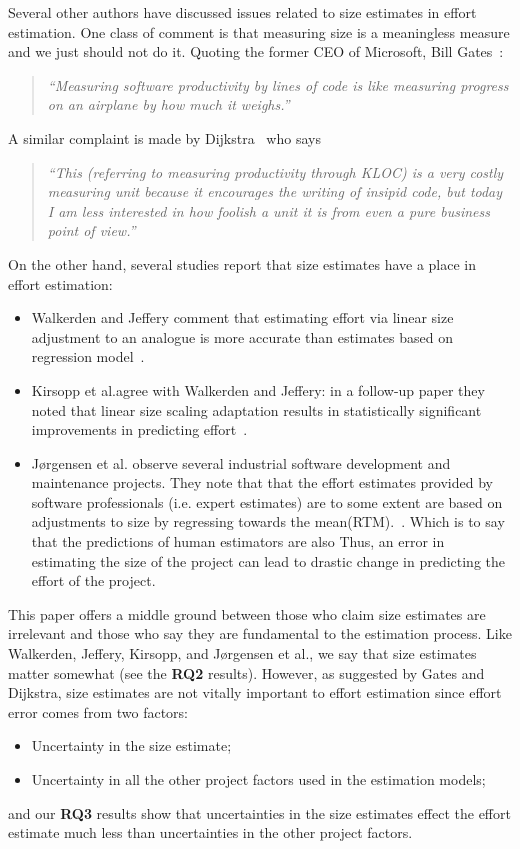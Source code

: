 \documentclass[final,twocolumn]{elsarticle}
\newcommand{\etal}{et al.}
\newcommand{\bi}{\begin{itemize}[leftmargin=0.4cm]}
\newcommand{\ei}{\end{itemize}}
\theoremstyle{break}
\begin{document}
Several other authors have discussed issues related to size estimates in effort
estimation.  One class of comment is that measuring size is a meaningless
measure and we just should not do it.  Quoting the former CEO of Microsoft, Bill
Gates~\cite{goll04}:
\begin{quote}{\em ``Measuring software productivity by lines of code is
  like measuring progress on an airplane by how much it weighs.''}\end{quote}
A similar
complaint is made by Dijkstra~\cite{dij88} who says\begin{quote}
{\em ``This (referring to
  measuring productivity through KLOC) is a very costly measuring unit because it
  encourages the writing of insipid code, but today I am less interested in how
  foolish a unit it is from even a pure business point of view.''}
  \end{quote}
On the other hand, several studies report that size estimates have a place in
effort estimation:
\bi
\item
Walkerden and Jeffery comment that estimating effort via linear size
adjustment to an analogue is more accurate than estimates based on regression
model~\cite{Walkerden1999}.
\item
  Kirsopp \etal agree with Walkerden and Jeffery: in a follow-up paper
they noted that  linear size scaling adaptation results in statistically
significant improvements in predicting
effort~\cite{kirsopp2003empirical}.
\item  J{\o}rgensen  et al. observe several industrial software development and
maintenance projects. They note that  that the effort estimates provided by software
professionals (i.e. expert estimates) are to some extent are based on adjustments
to size by regressing towards the mean(RTM).~\cite{jorgensen2003software}. Which is to say
that the predictions of human estimators are also Thus, an error in estimating the size
of the project can lead to drastic change in predicting the effort of the
project.
\ei
This paper offers a  middle ground between those who claim size estimates are irrelevant and those
who say they are fundamental to the estimation process.
 Like Walkerden, Jeffery, Kirsopp, and J{\o}rgensen  et al., we say that size estimates matter somewhat (see the {\bf RQ2} results).
 However, as suggested by Gates and Dijkstra, size estimates are   not vitally important to effort estimation
 since effort error comes from two factors:
 \bi
\item Uncertainty in the size estimate;
\item Uncertainty in all the other project factors used in the estimation models;
  \ei
  and our {\bf RQ3} results show that
  uncertainties in the size estimates effect the effort estimate much less than uncertainties in the other project factors.
  
\end{document}
